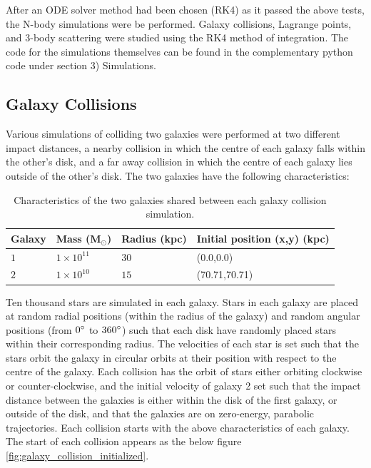 \documentclass[10pt,letterpaper]{article}
\begin{document}
After an ODE solver method had been chosen (RK4) as it passed the above tests, the N-body simulations were be performed. Galaxy collisions, Lagrange points, and 3-body scattering were studied using the RK4 method of integration. The code for the simulations themselves can be found in the complementary python code under section 3) Simulations.\\

\subsection{Galaxy Collisions}

Various simulations of colliding two galaxies were performed at two different impact distances, a nearby collision in which the centre of each galaxy falls within the other's disk, and a far away collision in which the centre of each galaxy lies outside of the other's disk. The two galaxies have the following characteristics:\\

\begin{table}[!htb]
\centering
\begin{tabular}{|l|l|l|l|}
\hline
Galaxy	&	Mass (M$_\odot$)	&	Radius (kpc)	&	Initial position (x,y) (kpc)\\
\hline
$1$		&	$1 \times 10^{11}$	&	$30$			&	(0.0,0.0) \\
\hline
$2$ 	&	$1 \times 10^{10}$	& 	$15$			&	(70.71,70.71)\\ 
\hline
\end{tabular}
\caption{Characteristics of the two galaxies shared between each galaxy collision simulation.}\label{tab:galaxy_collision_characteristics}
\end{table}

Ten thousand stars are simulated in each galaxy. Stars in each galaxy are placed at random radial positions (within the radius of the galaxy) and random angular positions (from $0 \degree$ to $360 \degree$) such that each disk have randomly placed stars within their corresponding radius. The velocities of each star is set such that the stars orbit the galaxy in circular orbits at their position with respect to the centre of the galaxy. Each collision has the orbit of stars either orbiting clockwise or counter-clockwise, and the initial velocity of galaxy 2 set such that the impact distance between the galaxies is either within the disk of the first galaxy, or outside of the disk, and that the galaxies are on zero-energy, parabolic trajectories. Each collision starts with the above characteristics of each galaxy. The start of each collision appears as the below figure \ref{fig:galaxy_collision_initialized}.\\
\end{document}
